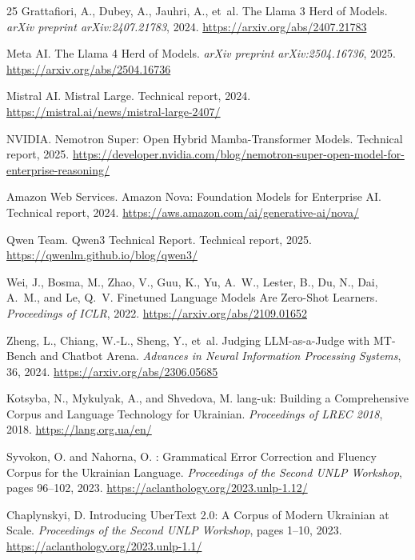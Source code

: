\documentclass[11pt,a4paper]{article}
\begin{document}
\begin{thebibliography}{25}
Grattafiori, A., Dubey, A., Jauhri, A., et~al.
\newblock The Llama 3 Herd of Models.
\newblock \emph{arXiv preprint arXiv:2407.21783}, 2024.
\newblock \url{https://arxiv.org/abs/2407.21783}

{Meta AI}.
\newblock The Llama 4 Herd of Models.
\newblock \emph{arXiv preprint arXiv:2504.16736}, 2025.
\newblock \url{https://arxiv.org/abs/2504.16736}

{Mistral AI}.
\newblock Mistral Large.
\newblock Technical report, 2024.
\newblock \url{https://mistral.ai/news/mistral-large-2407/}

{NVIDIA}.
\newblock Nemotron Super: Open Hybrid Mamba-Transformer Models.
\newblock Technical report, 2025.
\newblock \url{https://developer.nvidia.com/blog/nemotron-super-open-model-for-enterprise-reasoning/}

{Amazon Web Services}.
\newblock Amazon Nova: Foundation Models for Enterprise AI.
\newblock Technical report, 2024.
\newblock \url{https://aws.amazon.com/ai/generative-ai/nova/}

{Qwen Team}.
\newblock Qwen3 Technical Report.
\newblock Technical report, 2025.
\newblock \url{https://qwenlm.github.io/blog/qwen3/}

Wei, J., Bosma, M., Zhao, V., Guu, K., Yu, A.~W., Lester, B., Du, N., Dai, A.~M., and Le, Q.~V.
\newblock Finetuned Language Models Are Zero-Shot Learners.
\newblock \emph{Proceedings of ICLR}, 2022.
\newblock \url{https://arxiv.org/abs/2109.01652}

Zheng, L., Chiang, W.-L., Sheng, Y., et~al.
\newblock Judging LLM-as-a-Judge with MT-Bench and Chatbot Arena.
\newblock \emph{Advances in Neural Information Processing Systems}, 36, 2024.
\newblock \url{https://arxiv.org/abs/2306.05685}

Kotsyba, N., Mykulyak, A., and Shvedova, M.
\newblock lang-uk: Building a Comprehensive Corpus and Language Technology for Ukrainian.
\newblock \emph{Proceedings of LREC 2018}, 2018.
\newblock \url{https://lang.org.ua/en/}

Syvokon, O. and Nahorna, O.
: Grammatical Error Correction and Fluency Corpus for the Ukrainian Language.
\newblock \emph{Proceedings of the Second UNLP Workshop}, pages 96--102, 2023.
\newblock \url{https://aclanthology.org/2023.unlp-1.12/}

Chaplynskyi, D.
\newblock Introducing UberText 2.0: A Corpus of Modern Ukrainian at Scale.
\newblock \emph{Proceedings of the Second UNLP Workshop}, pages 1--10, 2023.
\newblock \url{https://aclanthology.org/2023.unlp-1.1/}

\end{thebibliography}
\end{document}
